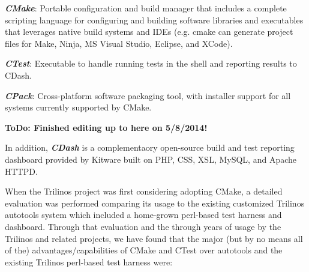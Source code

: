\documentclass[note]{TechNote}
\begin{document}
\begin{compactitem}
\item\textit{\textbf{CMake}}: Portable configuration and build manager that includes a complete scripting language for configuring and building software libraries and executables that leverages native build systems and IDEs (e.g. cmake can generate project files for Make, Ninja, MS Visual Studio, Eclipse, and XCode).
\item\textit{\textbf{CTest}}: Executable to handle running tests in the shell and reporting results to CDash.
\item\textit{\textbf{CPack}}: Cross-platform software packaging tool, with installer support for all systems currently supported by CMake.
\end{compactitem}

\textbf{ToDo: Finished editing up to here on 5/8/2014!}

In addition, \textit{\textbf{CDash}} is a complementaory open-source build and test reporting dashboard provided by Kitware built on PHP, CSS, XSL, MySQL, and Apache HTTPD.

When the Trilinos project was first considering adopting CMake, a detailed evaluation was performed \cite{TrilinosCMakeEvaluation08} comparing its usage to the existing customized Trilinos autotools system which included a home-grown perl-based test harness and dashboard.  Through that evaluation and the through years of usage by the Trilinos and related projects, we have found that the major (but by no means all of the) advantages/capabilities of CMake and CTest over autotools and the existing Trilinos perl-based test harness were:
\end{document}

